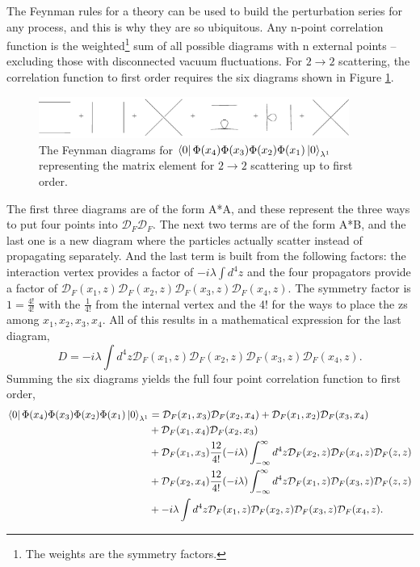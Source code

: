 \documentclass[12pt]{article}
\begin{document}
The Feynman rules for a theory can be used to build the perturbation series for any process, and this is why they are so ubiquitous. Any n-point correlation function is the weighted\footnote{The weights are the symmetry factors.} sum of all possible diagrams with n external points -- excluding those with disconnected vacuum fluctuations. For $2 \rightarrow 2$ scattering, the correlation function to first order requires the six diagrams shown in Figure \ref{fig:feyn2-2}. 
\begin{figure}[h!]
  \centering
  \includegraphics[width=4in]{images/phi4_2-2_scattering.pdf}
  \caption
   {The Feynman diagrams for $\bra{0}\Phi(x_4)\Phi(x_3)\Phi(x_2)\Phi(x_1)\ket{0}_{\lambda^1}$ representing the matrix element for $2\rightarrow 2$ scattering up to first order.}
  \label{fig:feyn2-2}
\end{figure}
The first three diagrams are of the form A*A, and these represent the three ways to put four points into $\mathcal{D}_F\mathcal{D}_F$. The next two terms are of the form A*B, and the last one is a new diagram where the particles actually scatter instead of propagating separately. And the last term is built from the following factors: the interaction vertex provides a factor of $-i\lambda\int d^4z$ and the four propagators provide a factor of $\mathcal{D}_F(x_1,z)\mathcal{D}_F(x_2,z)\mathcal{D}_F(x_3,z)\mathcal{D}_F(x_4,z)$. The symmetry factor is $1 = \frac{4!}{4!}$ with the $\frac{1}{4!}$ from the internal vertex and the 4! for the ways to place the zs among $x_1, x_2, x_3, x_4$. All of this results in a mathematical expression for the last diagram, 
\begin{equation}
D = -i\lambda\int d^4z\mathcal{D}_F(x_1,z)\mathcal{D}_F(x_2,z)\mathcal{D}_F(x_3,z)\mathcal{D}_F(x_4,z).
\end{equation}
Summing the six diagrams yields the full four point correlation function to first order,
\begin{equation}
\begin{split}
\bra{0}\Phi(x_4)\Phi(x_3)\Phi(x_2)\Phi(x_1)\ket{0}_{\lambda^1} &= \mathcal{D}_F(x_1,x_3)\mathcal{D}_F(x_2,x_4) + \mathcal{D}_F(x_1,x_2)\mathcal{D}_F(x_3,x_4) \\ & + \mathcal{D}_F(x_1,x_4)\mathcal{D}_F(x_2,x_3) \\ 
 &+ \mathcal{D}_F(x_1,x_3)\frac{12}{4!}(-i\lambda)\int_{-\infty}^{\infty} d^4z \mathcal{D}_F(x_2,z) \mathcal{D}_F(x_4,z) \mathcal{D}_F(z,z) \\
 &+ \mathcal{D}_F(x_2,x_4)\frac{12}{4!}(-i\lambda)\int_{-\infty}^{\infty} d^4z \mathcal{D}_F(x_1,z) \mathcal{D}_F(x_3,z) \mathcal{D}_F(z,z) \\
 &+ -i\lambda\int d^4z\mathcal{D}_F(x_1,z)\mathcal{D}_F(x_2,z)\mathcal{D}_F(x_3,z)\mathcal{D}_F(x_4,z).
\end{split}
\end{equation}
\end{document}
